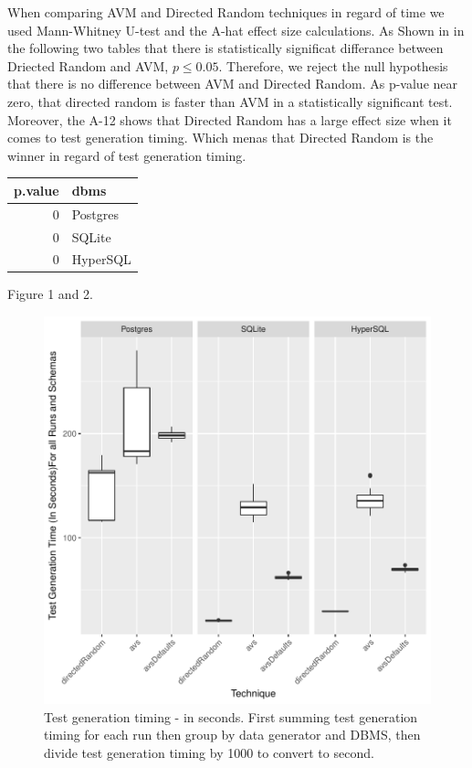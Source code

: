 \documentclass[runningheads,a4paper]{llncs}
\begin{document}
When comparing AVM and Directed Random techniques in regard of time we
used Mann-Whitney U-test and the A-hat effect size calculations. As
Shown in in the following two tables that there is statistically
significat differance between Driected Random and AVM, \(p \leq 0.05\).
Therefore, we reject the null hypothesis that there is no difference
between AVM and Directed Random. As p-value near zero, that directed
random is faster than AVM in a statistically significant test. Moreover,
the A-12 shows that Directed Random has a large effect size when it
comes to test generation timing. Which menas that Directed Random is the
winner in regard of test generation timing.

\begin{tabular}{r|l}
\hline
p.value & dbms\\
\hline
0 & Postgres\\
\hline
0 & SQLite\\
\hline
0 & HyperSQL\\
\hline
\end{tabular}

Figure 1 and 2.

\begin{figure}[h]
\centering
\includegraphics[width=\linewidth]{../plots/figure3.pdf}
\caption{Test generation timing - in seconds. First summing test
generation timing for each run then group by data generator and DBMS,
then divide test generation timing by 1000 to convert to second.}
\end{figure}
\end{document}
